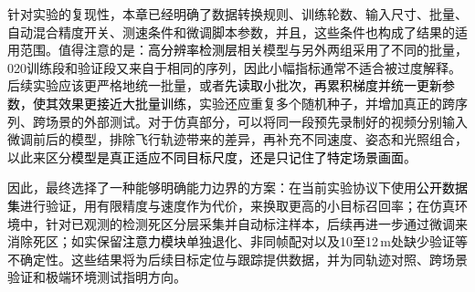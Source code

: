 针对实验的复现性，本章已经明确了数据转换规则、训练轮数、输入尺寸、批量、自动混合精度开关、测速条件和微调脚本参数，并且，这些条件也构成了结果的适用范围。值得注意的是：\textcolor{black}{高分辨率检测层}相关模型与另外两组采用了不同的批量，020训练段和验证段又来自于相同的序列，因此小幅指标通常不适合被过度解释。后续实验应该更严格地统一批量，或者\textcolor{black}{先读取小批次，再累积梯度并统一更新参数，使其效果更接近大批量训练，}实验还应重复多个随机种子，并增加真正的跨序列、跨场景的外部测试。对于仿真部分，可以将同一段预先录制好的视频分别输入微调前后的模型，排除飞行轨迹带来的差异，再补充不同速度、姿态和光照组合，以此来区分\textcolor{black}{模型是真正适应不同目标尺度，还是只记住了特定场景画面}。

因此，最终选择了一种能够明确能力边界的方案：在当前实验协议下使用\textcolor{black}{公开数据集}进行验证，用有限精度与速度作为代价，来换取更高的小目标召回率；在仿真环境中，针对已观测的检测死区分层采集并自动标注样本，后续再进一步通过微调来消除死区；如实保留\textcolor{black}{注意力模块}单独退化、非同帧配对以及10至12\,m处缺少验证等不确定性。这些结果将为后续目标定位与跟踪提供数据，并为同轨迹对照、跨场景验证和极端环境测试指明方向。
